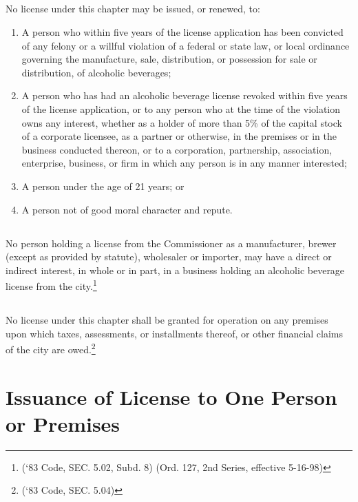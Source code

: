 \subsection{}
No license under this chapter may be issued, or renewed, to:
\begin{enumerate}[{\indent}1)]
    \item A person who within five years of the license application has been convicted of any felony or a willful violation of a federal or state law, or local ordinance governing the manufacture, sale, distribution, or possession for sale or distribution, of alcoholic beverages; 
    \item A person who has had an alcoholic beverage license revoked within five years of the license application, or to any person who at the time of the violation owns any interest, whether as a holder of more than 5\% of the capital stock of a corporate licensee, as a partner or otherwise, in the premises or in the business conducted thereon, or to a corporation, partnership, association, enterprise, business, or firm in which any person is in any manner interested; 
    \item A person under the age of 21 years; or
    \item A person not of good moral character and repute.
\end{enumerate}
\subsection{}
No person holding a license from the Commissioner as a manufacturer, brewer (except as provided by statute), wholesaler or importer, may have a direct or indirect interest, in whole or in part, in a business holding an alcoholic beverage license from the city.\footnote{(‘83 Code, SEC. 5.02, Subd. 8)  (Ord. 127, 2nd Series, effective 5-16-98)}
\subsection{}
No license under this chapter shall be granted for operation on any premises upon which taxes, assessments, or installments thereof, or other financial claims of the city are owed.\footnote{(‘83 Code, SEC. 5.04)}

\section{Issuance of License to One Person or Premises}
